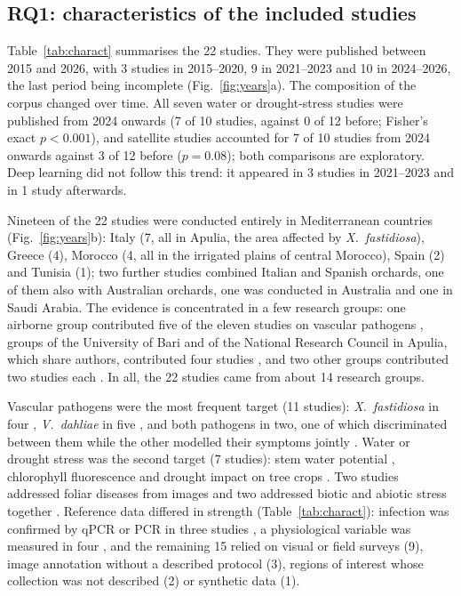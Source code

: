 \documentclass[preprint,12pt]{elsarticle}
\begin{document}
\subsection{RQ1: characteristics of the included studies}\label{sec:charact}
Table~\ref{tab:charact} summarises the 22 studies. They were published between 2015 and 2026, with 3 studies in 2015--2020, 9 in 2021--2023 and 10 in 2024--2026, the last period being incomplete (Fig.~\ref{fig:years}a). The composition of the corpus changed over time. All seven water or drought-stress studies were published from 2024 onwards (7 of 10 studies, against 0 of 12 before; Fisher's exact $p<0.001$), and satellite studies accounted for 7 of 10 studies from 2024 onwards against 3 of 12 before ($p=0.08$); both comparisons are exploratory. Deep learning did not follow this trend: it appeared in 3 studies in 2021--2023 and in 1 study afterwards.
 
Nineteen of the 22 studies were conducted entirely in Mediterranean countries (Fig.~\ref{fig:years}b): Italy (7, all in Apulia, the area affected by \textit{X.~fastidiosa}), Greece (4), Morocco (4, all in the irrigated plains of central Morocco), Spain (2) and Tunisia (1); two further studies combined Italian and Spanish orchards, one of them also with Australian orchards, one was conducted in Australia and one in Saudi Arabia. The evidence is concentrated in a few research groups: one airborne group contributed five of the eleven studies on vascular pathogens \citep{u002,u008,u030,u056,u121}, groups of the University of Bari and of the National Research Council in Apulia, which share authors, contributed four studies \citep{u081,u106,u108,u113}, and two other groups contributed two studies each \citep{u045,u054,u138,u135}. In all, the 22 studies came from about 14 research groups.
 
Vascular pathogens were the most frequent target (11 studies): \textit{X.~fastidiosa} in four \citep{u008,u013,u036,u113}, \textit{V.~dahliae} in five \citep{u002,u021,u055,u121,kallel2022olive}, and both pathogens in two, one of which discriminated between them \citep{u030} while the other modelled their symptoms jointly \citep{u056}. Water or drought stress was the second target (7 studies): stem water potential \citep{u081,u108,u133}, chlorophyll fluorescence \citep{u106} and drought impact on tree crops \citep{u105,u138,u135}. Two studies addressed foliar diseases from images \citep{u046,u080} and two addressed biotic and abiotic stress together \citep{u045,u054}. Reference data differed in strength (Table~\ref{tab:charact}): infection was confirmed by qPCR or PCR in three studies \citep{u008,u030,u113}, a physiological variable was measured in four \citep{u081,u106,u108,u133}, and the remaining 15 relied on visual or field surveys (9), image annotation without a described protocol (3), regions of interest whose collection was not described (2) or synthetic data (1).
 
\end{document}
